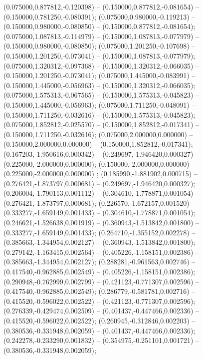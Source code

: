  (0.075000,0.877812,-0.120398) -- (0.150000,0.877812,-0.081654) -- (0.150000,0.781250,-0.080391);
 (0.075000,0.980000,-0.119213) -- (0.150000,0.980000,-0.080850) -- (0.150000,0.877812,-0.081654);
 (0.075000,1.087813,-0.114979) -- (0.150000,1.087813,-0.077979) -- (0.150000,0.980000,-0.080850);
 (0.075000,1.201250,-0.107698) -- (0.150000,1.201250,-0.073041) -- (0.150000,1.087813,-0.077979);
 (0.075000,1.320312,-0.097368) -- (0.150000,1.320312,-0.066035) -- (0.150000,1.201250,-0.073041);
 (0.075000,1.445000,-0.083991) -- (0.150000,1.445000,-0.056963) -- (0.150000,1.320312,-0.066035);
 (0.075000,1.575313,-0.067565) -- (0.150000,1.575313,-0.045823) -- (0.150000,1.445000,-0.056963);
 (0.075000,1.711250,-0.048091) -- (0.150000,1.711250,-0.032616) -- (0.150000,1.575313,-0.045823);
 (0.075000,1.852812,-0.025570) -- (0.150000,1.852812,-0.017341) -- (0.150000,1.711250,-0.032616);
 (0.075000,2.000000,0.000000) -- (0.150000,2.000000,0.000000) -- (0.150000,1.852812,-0.017341);
 (0.167203,-1.950616,0.000342) -- (0.249697,-1.946420,0.000327) -- (0.225000,-2.000000,0.000000);
 (0.150000,-2.000000,0.000000) -- (0.225000,-2.000000,0.000000) ;
 (0.185990,-1.881902,0.000715) -- (0.276421,-1.873797,0.000681) -- (0.249697,-1.946420,0.000327);
 (0.206004,-1.790113,0.001112) -- (0.304610,-1.778871,0.001054) -- (0.276421,-1.873797,0.000681);
 (0.226570,-1.672157,0.001520) -- (0.333277,-1.659149,0.001433) -- (0.304610,-1.778871,0.001054);
 (0.246621,-1.526638,0.001919) -- (0.360943,-1.513842,0.001800) -- (0.333277,-1.659149,0.001433);
 (0.264710,-1.355152,0.002278) -- (0.385663,-1.344954,0.002127) -- (0.360943,-1.513842,0.001800);
 (0.279142,-1.163415,0.002564) -- (0.405226,-1.158151,0.002386) -- (0.385663,-1.344954,0.002127);
 (0.288281,-0.961563,0.002746) -- (0.417540,-0.962885,0.002549) -- (0.405226,-1.158151,0.002386);
 (0.290948,-0.762999,0.002799) -- (0.421123,-0.771307,0.002596) -- (0.417540,-0.962885,0.002549);
 (0.286779,-0.581781,0.002716) -- (0.415520,-0.596022,0.002522) -- (0.421123,-0.771307,0.002596);
 (0.276339,-0.429474,0.002509) -- (0.401437,-0.447466,0.002336) -- (0.415520,-0.596022,0.002522);
 (0.260945,-0.312846,0.002203) -- (0.380536,-0.331948,0.002059) -- (0.401437,-0.447466,0.002336);
 (0.242278,-0.233290,0.001832) -- (0.354975,-0.251101,0.001721) -- (0.380536,-0.331948,0.002059);
